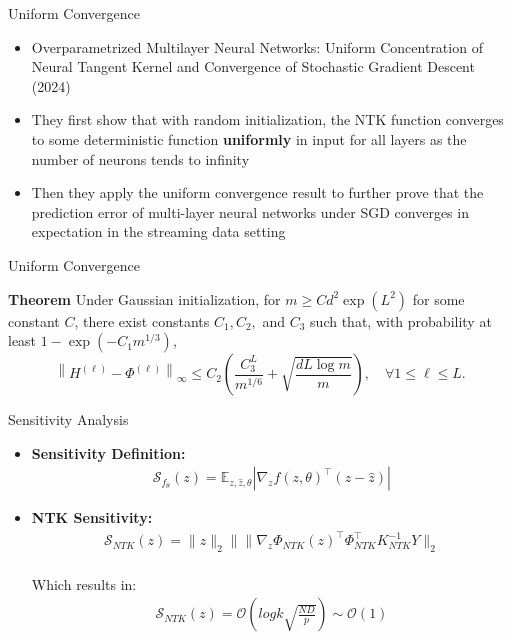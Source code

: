 \documentclass[serif, aspectratio=169]{beamer}
\begin{document}
\begin{frame}{Uniform Convergence}
	\begin{itemize}
		
\item Overparametrized Multilayer Neural Networks: Uniform Concentration of Neural Tangent Kernel and Convergence of Stochastic Gradient Descent (2024)
\item They first show that with random initialization, the NTK function converges to some
deterministic function \textbf{uniformly} in input for all layers as the number of neurons tends to infinity
\item Then they apply the uniform convergence result to further prove that the prediction error of multi-layer neural networks under SGD converges in expectation in the streaming data setting
	\end{itemize}

\end{frame}


\begin{frame}{Uniform Convergence}

\textbf{Theorem} Under Gaussian initialization, for \( m \geq C d^2 \exp(L^2) \) for some constant \( C \), there exist constants \( C_1, C_2, \) and \( C_3 \) such that, with probability at least \( 1 - \exp(-C_1 m^{1/3}) \),
\[
\left\| H^{(\ell)} - \Phi^{(\ell)} \right\|_{\infty} \leq C_2 \left( \frac{C_3^L}{m^{1/6}} + \sqrt{\frac{d L \log m}{m}} \right), \quad \forall 1 \leq \ell \leq L.
\]

	
\end{frame}


\begin{frame}{Sensitivity Analysis}
	\begin{itemize}
		\item \textbf{Sensitivity Definition:}
		\begin{align*}                
			\mathcal{S}_{f_{\theta}}(z) = \mathbb{E}_{z, \hat{z}, \theta} | \nabla_{z} f(z, \theta)^{\top} (z - \hat{z}) |
		\end{align*}
		\item \textbf{NTK Sensitivity:}
		\begin{align*}
			\mathcal{S}_{NTK}(z) = \|z\|_{2} \| \| \nabla_{z} \Phi_{NTK}(z)^{\top} \Phi_{NTK}^{\top} K_{NTK}^{-1} Y \|_{2}
		\end{align*}\\
		Which results in:
		\begin{align*}
			\mathcal{S}_{NTK}(z) = \mathcal{O}\left(log k \sqrt{\frac{ND}{p}}\right) \sim \mathcal{O}(1)
		\end{align*}
	\end{itemize}
\end{frame}
\end{document}
